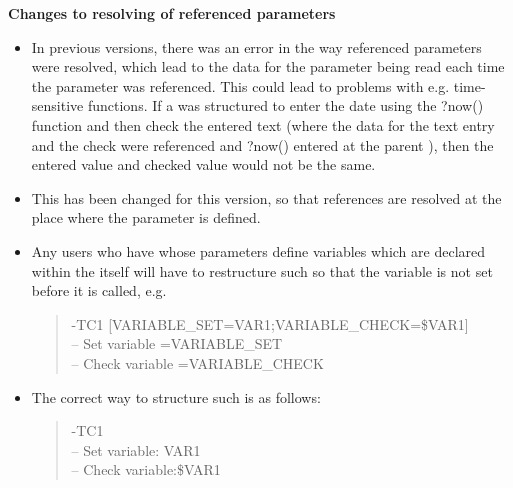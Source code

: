 \textbf{Changes to resolving of referenced parameters}\\
\begin{itemize}
\item In previous versions, there was an error in the way referenced parameters were resolved, which lead to the data for the parameter being read each time the parameter was referenced. This could lead to problems with e.g. time-sensitive functions. If a \gdcase{} was structured to enter the date using the ?now() function and then check the entered text (where the data for the text entry and the check were referenced and ?now() entered at the parent \gdcase{}), then the entered value and checked value would not be the same.
\item This has been changed for this version, so that references are resolved at the place where the parameter is defined. 
\item Any users who have \gdcases{} whose parameters define variables which are declared within the \gdcase{} itself will have to restructure such \gdcases{} so that the variable is not set before it is called, e.g.
\begin{quote}
-TC1 [VARIABLE\_SET=VAR1;VARIABLE\_CHECK=\$VAR1]\\
-- Set variable =VARIABLE\_SET\\
-- Check variable =VARIABLE\_CHECK
\end{quote}
\item The correct way to structure such \gdcases{} is as follows:
\begin{quote}
-TC1\\
-- Set variable: VAR1\\
-- Check variable:\$VAR1
\end{quote}
\end{itemize}
